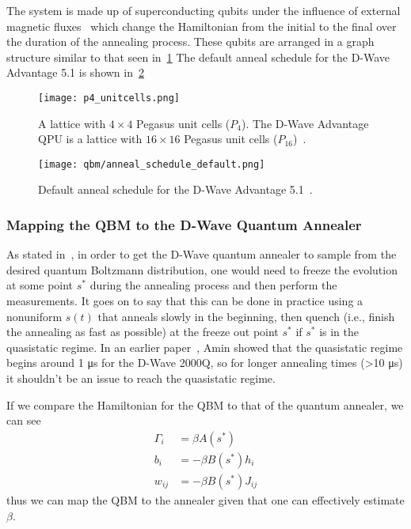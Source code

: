 The system is made up of superconducting qubits under the influence of external magnetic fluxes~\cite{qc_lecture_notes} which change the Hamiltonian from the initial to the final over the duration of the annealing process.
These qubits are arranged in a graph structure similar to that seen in~\cref{fig:p4_unitcells}
The default anneal schedule for the D-Wave Advantage 5.1 is shown in~\cref{fig:anneal_schedule_default}
\begin{figure}[!htb]
    \begin{center}
        \texttt{[image: p4\_unitcells.png]}
    \end{center}
    \caption{A lattice with \( 4 \times 4 \) Pegasus unit cells (\( P_4 \)). The D-Wave Advantage QPU is a lattice with \( 16 \times 16 \) Pegasus unit cells (\( P_{16} \))~\cite{dwave_topologies}.}
    \label{fig:p4_unitcells}
\end{figure}
\begin{figure}[!htb]
    \begin{center}
        \texttt{[image: qbm/anneal\_schedule\_default.png]}
    \end{center}
    \caption{Default anneal schedule for the D-Wave Advantage 5.1~\cite{dwave_anneal_schedules}.}
    \label{fig:anneal_schedule_default}
\end{figure}

\subsubsection{Mapping the QBM to the D-Wave Quantum Annealer}
As stated in~\cite{amin_2018}, in order to get the D-Wave quantum annealer to sample from the desired quantum Boltzmann distribution, one would need to freeze the evolution at some point \( s^* \) during the annealing process and then perform the measurements.
It goes on to say that this can be done in practice using a nonuniform \( s(t) \) that anneals slowly in the beginning, then quench (i.e., finish the annealing as fast as possible) at the freeze out point \( s^* \) if \( s^* \) is in the quasistatic regime.
In an earlier paper~\cite{amin_2015}, Amin showed that the quasistatic regime begins around 1 \si{\micro\second} for the D-Wave 2000Q, so for longer annealing times (>10 \si{\micro\second}) it shouldn't be an issue to reach the quasistatic regime.

If we compare the Hamiltonian for the QBM to that of the quantum annealer, we can see
\begin{align}
    \Gamma_i
        &= \beta A(s^*) \\
    b_i
        &= -\beta B(s^*) h_i \\
    w_{ij}
        &= -\beta B(s^*) J_{ij}
\end{align}
thus we can map the QBM to the annealer given that one can effectively estimate \( \beta \).

